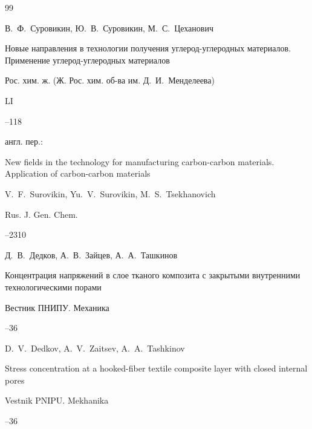 \begin{thebibliography}{99}




\by В.~Ф.~Суровикин, Ю.~В.~Суровикин, М.~С.~Цеханович

\paper Новые направления в технологии получения углерод-углеродных материалов. Применение углерод-углеродных материалов

\jour Рос. хим. ж. (Ж. Рос. хим. об-ва им. Д.~И.~Менделеева)


 \vol LI


 --118

\transl англ. пер.:~

\paper New fields in the technology for manufacturing carbon-carbon materials. Application of carbon-carbon materials

\by V.~F.~Surovikin,  Yu.~V.~Surovikin,  M.~S.~Tsekhanovich

\jour Rus. J. Gen. Chem.




--2310   


 




 \by Д.~В.~Дедков, А.~В.~Зайцев, А.~А.~Ташкинов

 \paper Концентрация напряжений в слое тканого композита с закрытыми внутренними технологическими порами

 \jour Вестник ПНИПУ. Механика



 --36

 \misctransl

\by D.~V.~Dedkov, A.~V.~Zaitsev, A.~A.~Tashkinov

\paper Stress concentration at a hooked-fiber textile composite layer with closed internal pores


 \jour Vestnik PNIPU. Mekhanika


 --36






\end{thebibliography}
